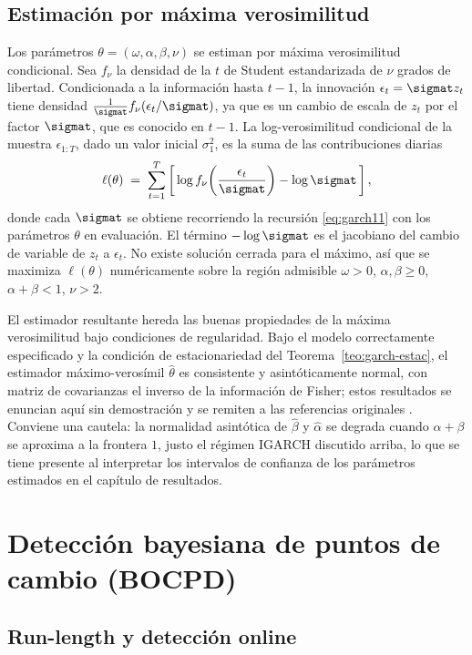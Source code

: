 \subsection{Estimación por máxima verosimilitud}
\label{sec:garch-mv}

Los parámetros $\theta = (\omega, \alpha, \beta, \nu)$ se estiman por máxima verosimilitud condicional. Sea $f_\nu$ la densidad de la $t$ de Student estandarizada de $\nu$ grados de libertad. Condicionada a la información hasta $t-1$, la innovación $\epsilon_t = \sigmat z_t$ tiene densidad $\tfrac{1}{\sigmat} f_\nu(\epsilon_t/\sigmat)$, ya que es un cambio de escala de $z_t$ por el factor $\sigmat$, que es conocido en $t-1$. La log-verosimilitud condicional de la muestra $\epsilon_{1:T}$, dado un valor inicial $\sigma_1^2$, es la suma de las contribuciones diarias
\[
\ell(\theta) \;=\; \sum_{t=1}^{T} \left[\, \log f_\nu\!\left(\frac{\epsilon_t}{\sigmat}\right) - \log \sigmat \,\right],
\]
donde cada $\sigmat$ se obtiene recorriendo la recursión \eqref{eq:garch11} con los parámetros $\theta$ en evaluación. El término $-\log\sigmat$ es el jacobiano del cambio de variable de $z_t$ a $\epsilon_t$. No existe solución cerrada para el máximo, así que se maximiza $\ell(\theta)$ numéricamente sobre la región admisible $\omega>0$, $\alpha,\beta\ge 0$, $\alpha+\beta<1$, $\nu>2$.

El estimador resultante hereda las buenas propiedades de la máxima verosimilitud bajo condiciones de regularidad. Bajo el modelo correctamente especificado y la condición de estacionariedad del Teorema~\ref{teo:garch-estac}, el estimador máximo-verosímil $\hat\theta$ es consistente y asintóticamente normal, con matriz de covarianzas el inverso de la información de Fisher; estos resultados se enuncian aquí sin demostración y se remiten a las referencias originales \cite{bollerslev1986, bollerslev1987}. Conviene una cautela: la normalidad asintótica de $\hat\beta$ y $\hat\alpha$ se degrada cuando $\alpha+\beta$ se aproxima a la frontera $1$, justo el régimen IGARCH discutido arriba, lo que se tiene presente al interpretar los intervalos de confianza de los parámetros estimados en el capítulo de resultados.

\section{Detección bayesiana de puntos de cambio (BOCPD)}
\label{sec:bocpd}

\subsection{Run-length y detección online}
\label{sec:bocpd-runlength}

